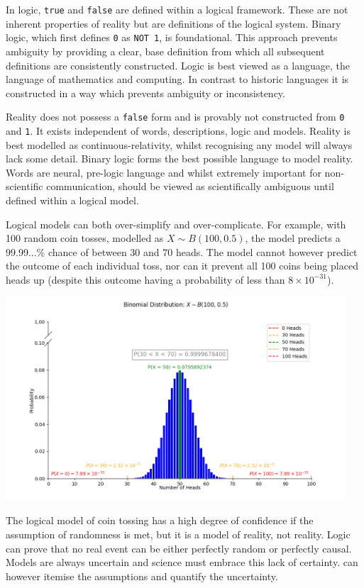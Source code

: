 \documentclass[12pt]{article}
\begin{document}
In logic, \texttt{true} and \texttt{false} are defined within a logical framework. These are not inherent properties of reality but are definitions of the logical system. Binary logic, which first defines \texttt{0} as \texttt{NOT 1}, is foundational. This approach prevents ambiguity by providing a clear, base definition from which all subsequent definitions are consistently constructed. Logic is best viewed as a language, the language of mathematics and computing. In contrast to historic languages it is constructed in a way which prevents ambiguity or inconsistency.

Reality does not possess a \texttt{false} form and is provably not constructed from \texttt{0} and \texttt{1}. It exists independent of words, descriptions, logic and models. Reality is best modelled as continuous-relativity, whilst recognising any model will always lack some detail. Binary logic forms the best possible language to model reality. Words are neural, pre-logic language and whilst extremely important for non-scientific communication, should be viewed as scientifically ambiguous until defined within a logical model.

Logical models can both over-simplify and over-complicate. For example, with 100 random coin tosses, modelled as \( X \sim B(100,0.5) \), the model predicts a 99.99...\% chance of between 30 and 70 heads. The model cannot however predict the outcome of each individual toss, nor can it prevent all 100 coins being placed heads up (despite this outcome having a probability of less than  \( 8 \times 10^{-31} \)).

\includegraphics[width=0.95\textwidth]{binomial.png}

The logical model of coin tossing has a high degree of confidence if the assumption of randomness is met, but it is a model of reality, not reality. Logic can prove that no real event can be either perfectly random or perfectly causal. Models are always uncertain and science must embrace this lack of certainty. \iR{} can however itemise the assumptions and quantify the uncertainty.
\end{document}
